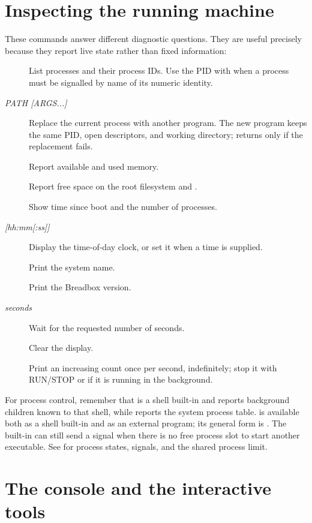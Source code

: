 \section{Inspecting the running machine}

These commands answer different diagnostic questions. They are useful precisely because they report live state rather than fixed information:

\begin{description}
  \item[] List processes and their process IDs. Use the PID with  when a process must be signalled by name of its numeric identity.
  \item[ \textit{PATH [ARGS...]}] Replace the current process with another program. The new program keeps the same PID, open descriptors, and working directory;  returns only if the replacement fails.
  \item[] Report available and used memory.
  \item[] Report free space on the root filesystem and .
  \item[] Show time since boot and the number of processes.
  \item[ \textit{[hh:mm[:ss]]}] Display the time-of-day clock, or set it when a time is supplied.
  \item[] Print the system name.
  \item[] Print the Breadbox version.
  \item[ \textit{seconds}] Wait for the requested number of seconds.
  \item[] Clear the display.
  \item[] Print an increasing count once per second, indefinitely; stop it with RUN/STOP or  if it is running in the background.
\end{description}

For process control, remember that  is a shell built-in and reports background children known to that shell, while  reports the system process table.  is available both as a shell built-in and as an external program; its general form is . The built-in can still send a signal when there is no free process slot to start another executable. See  for process states, signals, and the shared process limit.

\section{The console and the interactive tools}

